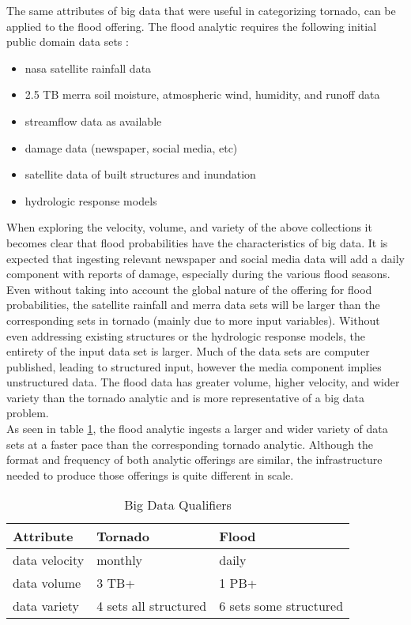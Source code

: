 The same attributes of big data that were useful in categorizing tornado, can be applied to the flood offering. The flood analytic requires the following initial public domain data sets \cite{walker}:
\begin{itemize}
    \item \gls{nasa} satellite rainfall data
    \item 2.5 TB \gls{merra} soil moisture, atmospheric wind, humidity, and runoff data
    \item streamflow data as available
    \item damage data (newspaper, social media, etc)
    \item satellite data of built structures and inundation
    \item hydrologic response models
\end{itemize}
When exploring the velocity, volume, and variety of the above collections it becomes clear that flood probabilities have the characteristics of big data. It is expected that ingesting relevant newspaper and social media data will add a daily component with reports of damage, especially during the various flood seasons. Even without taking into account the global nature of the offering for flood probabilities, the satellite rainfall and \gls{merra} data sets will be larger than the corresponding sets in tornado (mainly due to more input variables). Without even addressing existing structures or the hydrologic response models, the entirety of the input data set is larger. Much of the data sets are computer published, leading to structured input, however the media component implies unstructured data. The flood data has greater volume, higher velocity, and wider variety than the tornado analytic and is more representative of a big data problem.\\

As seen in table \ref{qualifiers}, the flood analytic ingests a larger and wider variety of data sets at a faster pace than the corresponding tornado analytic. Although the format and frequency of both analytic offerings are similar, the infrastructure needed to produce those offerings is quite different in scale.
\begin{table}[htbp]
    \centering
    \begin{tabular}{l l l}
        \hline
        Attribute & Tornado & Flood\\ [0.5ex]
        \hline
        data velocity & monthly & daily\\
        data volume &  3 TB+  & 1 PB+\\
        data variety &  4 sets all structured & 6 sets some structured\\
        \hline
    \end{tabular}
    \caption{Big Data Qualifiers}
    \label{qualifiers}
\end{table}
